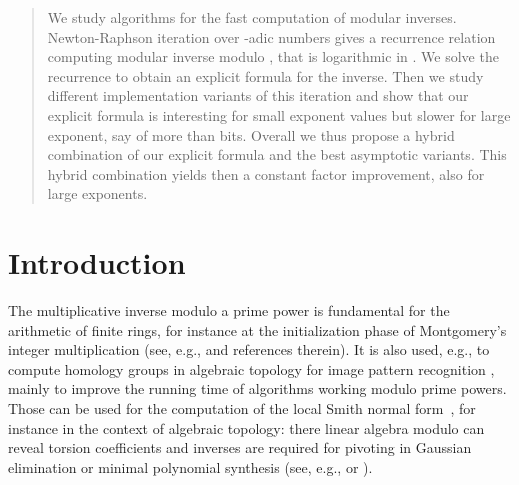 \maketitle
\renewcommand{\algorithmicrequire}{{\textbf{Input:}}}
\renewcommand{\algorithmicensure}{{\textbf{Output:}}}
\makeatletter
\newcommand{\IFTHEN}[3][default]{\ALC@it\algorithmicif\ #2\
  \algorithmicthen\ #3\
  \ifthenelse{\boolean{ALC@noend}}{}{\algorithmicendif\ } \ALC@com{#1}}
\makeatother
\newcommand{\bigO}[1]{\ensuremath{\mathcal{O}\left(#1\right)}\xspace}
\newcommand{\LOGAND}{~\&\,}
\newcommand{\LOGANDIN}{~\&=\,}
\newcommand{\LOGORIN}{~|=\,}
\newcommand{\MULIN}{~*=\,}
\newcommand{\MOD}{~\%\,}
\newcommand{\MODIN}{~\%=\,}
\newcommand{\SUBIN}{~-=\,}
\newcommand{\ADDIN}{~+=\,}


\begin{abstract} 
  We study algorithms for the fast computation of modular inverses.
  Newton-Raphson iteration over -adic numbers gives a recurrence relation computing modular inverse modulo , that is logarithmic in . 
  We solve the recurrence to obtain an explicit formula for the inverse. 
  Then we study different implementation variants of this iteration and show that our explicit formula is interesting for small exponent values but slower for large exponent, say of more than  bits.
  Overall we thus propose a hybrid combination of our explicit formula and the best asymptotic variants. This hybrid combination yields then a constant factor improvement, also for large exponents. 
\end{abstract}
\section{Introduction}
The multiplicative inverse modulo a prime power is fundamental for the
arithmetic of finite rings, for instance at the initialization phase of
Montgomery's integer multiplication (see, e.g.,
\cite{Dusse:1990:eurocrypt,Arazi:2008:CMI} and references therein). 
It is also used, e.g., to compute homology groups in algebraic topology for
image pattern recognition \cite{jgd:2003:GAP}, mainly to improve the running
time of algorithms working modulo prime powers. Those can be used for the
computation of the local Smith normal
form~\cite{jgd:2001:JSC,Elsheikh:2012:ISSAC}, for instance in the context of
algebraic topology: there linear algebra
modulo  can reveal torsion coefficients and inverses are required for
pivoting in Gaussian elimination or minimal polynomial synthesis (see, e.g.,
\cite[algorithm LRE]{jgd:2003:GAP} or \cite{Reeds:1985:SRS}). 


